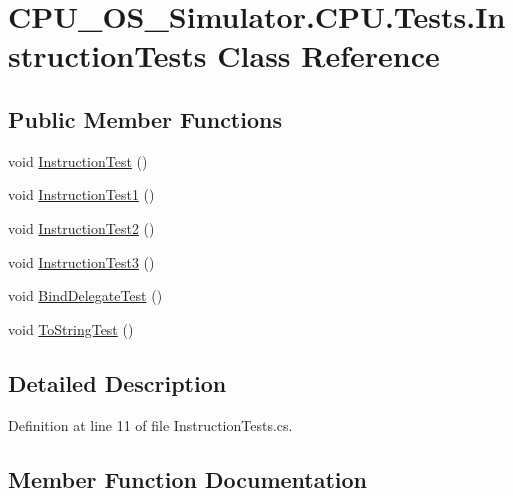 \hypertarget{class_c_p_u___o_s___simulator_1_1_c_p_u_1_1_tests_1_1_instruction_tests}{}\section{C\+P\+U\+\_\+\+O\+S\+\_\+\+Simulator.\+C\+P\+U.\+Tests.\+Instruction\+Tests Class Reference}
\label{class_c_p_u___o_s___simulator_1_1_c_p_u_1_1_tests_1_1_instruction_tests}
\subsection*{Public Member Functions}
\begin{DoxyCompactItemize}
\item 
void \hyperlink{class_c_p_u___o_s___simulator_1_1_c_p_u_1_1_tests_1_1_instruction_tests_a1305b71dfc46b89f314713c65bac2e7c}{Instruction\+Test} ()
\item 
void \hyperlink{class_c_p_u___o_s___simulator_1_1_c_p_u_1_1_tests_1_1_instruction_tests_abc74bfc3bc7d34eba9e033327a642e96}{Instruction\+Test1} ()
\item 
void \hyperlink{class_c_p_u___o_s___simulator_1_1_c_p_u_1_1_tests_1_1_instruction_tests_a4fd3d1dfc697b33ea1a2b415f7c45119}{Instruction\+Test2} ()
\item 
void \hyperlink{class_c_p_u___o_s___simulator_1_1_c_p_u_1_1_tests_1_1_instruction_tests_a5ed7093663951b67219cc7669295d2d1}{Instruction\+Test3} ()
\item 
void \hyperlink{class_c_p_u___o_s___simulator_1_1_c_p_u_1_1_tests_1_1_instruction_tests_a08e3bc0d16c5a749657986cfb06d7544}{Bind\+Delegate\+Test} ()
\item 
void \hyperlink{class_c_p_u___o_s___simulator_1_1_c_p_u_1_1_tests_1_1_instruction_tests_a4966086b23824a6795e3325ab747eeba}{To\+String\+Test} ()
\end{DoxyCompactItemize}


\subsection{Detailed Description}


Definition at line 11 of file Instruction\+Tests.\+cs.



\subsection{Member Function Documentation}
\hypertarget{class_c_p_u___o_s___simulator_1_1_c_p_u_1_1_tests_1_1_instruction_tests_a08e3bc0d16c5a749657986cfb06d7544}{}
